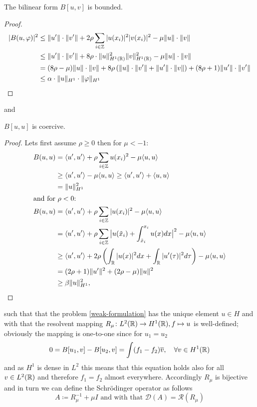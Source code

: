 \begin{theorem} \label{1.1}
	The bilinear form $B[u, v]$ is bounded.
	
	\begin{proof}
		\begin{align*}
			| B(u, \varphi)|^{2} & \leq \| u' \| \cdot \| v' \| + 2 \rho \sum_{i \in \mathbb{Z}} |u(x_{i})|^{2} |v(x_{i})|^{2} - \mu \| u \| \cdot \| v \| \\
				& \leq \| u' \| \cdot \| v' \| + 8 \rho \cdot \| u \|^{2}_{H^{1}(\mathbb{R})} \| v \|^{2}_{H^{1}(\mathbb{R})}  - \mu \| u \| \cdot \| v \| \\
				& = (8\rho - \mu) \| u \| \cdot \| v \| + 8\rho \left( \| u \| \cdot \| v' \| + \| u' \| \cdot \| v \| \right) + (8\rho + 1) \| u' \| \cdot \| v'\| \\
				& \leq \alpha \cdot \| u \|_{H^{1}} \cdot \| \varphi \|_{H^{1}}
		\end{align*}
	\end{proof}
\end{theorem}
and
\begin{theorem} \label{1.2}
	$B[u, u]$ is coercive.
	
	\begin{proof}
		Lets first assume $\rho \geq 0$ then for $\mu < -1$:
		\begin{align*}
			B(u, u) & = \langle u' , u' \rangle + \rho \sum_{i \in \mathbb{Z}} u(x_{i})^{2} - \mu \langle u , u \rangle \\
					& \geq \langle u' , u' \rangle - \mu \langle u , u \rangle \geq \langle u' , u' \rangle  + \langle u , u \rangle \\
					& = \| u \|_{H^{1}}^{2} \\
		\intertext{and for $\rho < 0$:}
			B(u, u) & = \langle u' , u' \rangle + \rho \sum_{i \in \mathbb{Z}} |u(x_{i})|^{2} - \mu 	\langle u , u \rangle \\
					& = \langle u' , u' \rangle + \rho \sum_{i \in \mathbb{Z}} \big| u(\tilde{x}_{i}) + \int_{\tilde{x}_{i}}^{x_{i}} u(x) dx \big|^{2} - \mu \langle u , u \rangle \\
					& \geq \langle u' , u' \rangle + 2 \rho \left( \int_{\mathbb{R}} |u(x)|^{2} dx + \int_{\mathbb{R}} |u'(\tau)|^{2} d\tau \right) - \mu \langle u , u \rangle \\
					& = (2 \rho + 1) \| u' \|^{2} + (2\rho - \mu) \| u \|^{2}  \\
					& \geq \beta \| u \|_{H^{1}}^{2},
		\end{align*}
	\end{proof}
\end{theorem}
such that that the problem \eqref{weak-formulation} has the unique element $u \in H$ and with that the resolvent mapping $R_{\mu} \colon L^{2}(\mathbb{R}) \rightarrow H^{1}(\mathbb{R}), f \mapsto u$ is well-defined; obviously the mapping is one-to-one since for $u_{1} = u_{2}$
	\[ 0 = B[u_{1}, v] - B[u_{2}, v]= \int (f_{1} - f_{2}) \overline{v}, \quad \forall v \in H^{1}(\mathbb{R}) \]
and as $H^{1}$ is dense in $L^{2}$ this means that this equation holds also for all $v \in L^{2}(\mathbb{R})$ and therefore $f_{1} = f_{2}$ almost everywhere. Accordingly $R_{\mu}$ is bijective and in turn we can define the Schrödinger operator as follows
		\[ A \coloneqq R_{\mu}^{-1} + \mu I \text{ and with that } \mathcal{D}(A) = \mathcal{R}(R_{\mu}) \]